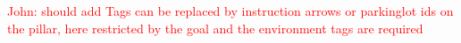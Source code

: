 \documentclass[journal]{IEEEtran}
\newcommand{\COMMENT}[1]{\textcolor{red}{#1}}
\begin{document}
\COMMENT{John: should add Tags can be replaced by instruction arrows or parkinglot ids on the pillar, here restricted by the goal and the environment tags are required }
%
%



%
%
\end{document}
